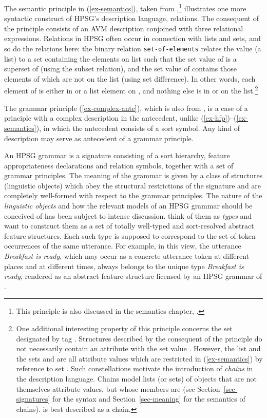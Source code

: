 \documentclass[output=paper
 	        ,biblatex
                ,babelshorthands
                ,newtxmath
                ,draftmode
                ,colorlinks, citecolor=brown
]{langscibook}
\begin{document}
{The semantic principle in (\ref{ex-semantics}), taken
from ,\footnote{This principle is also discussed
in the semantics chapter, .}
illustrates one more syntactic
construct of HPSG's description language, relations. The consequent of
the principle consists of an AVM description conjoined with three
relational expressions.  Relations in HPSG often occur in
connection with lists and sets, and so do the relations here: the
binary relation \texttt{set-of-elements} relates the  value
(a list) to a set  containing the elements on list  such
that the set value  of  is a superset of 
(using the subset relation), and the set value  of 
contains those elements of  which are not on the
 list (using set difference). In other words,
each element of  is either in \mbox{} or
a list element on , and nothing else is in 
or on the  list.\footnote{One
  additional interesting property of this principle concerns the set
  designated by tag . Structures described by the consequent of
  the principle do not necessarily contain an attribute with the set
  value . However, the list  and the sets  and  are
  all attribute values which are restricted in (\ref{ex-semantics}) by reference to set
  . Such constellations motivate the introduction of
  \emph{chains} in the description language. Chains model lists (or
  sets) of objects that are not themselves attribute values, but whose
  members are (see Section~\ref{sec-signatures} for the syntax and
  Section~\ref{sec-meaning} for the semantics of chains).  is best
  described as a chain.}

The grammar principle (\ref{ex-complex-ante}), which is also from
\cite[421]{PY98a-u}, is a case of a principle
with a complex description in the antecedent,
unlike (\ref{ex-hfp})--(\ref{ex-semantics}), in which the antecedent
consists of a sort symbol. Any kind of description
may serve as antecedent of a grammar principle.

An HPSG grammar is a signature consisting of a sort hierarchy, feature
appropriateness declarations and relation symbols, together with a set
of grammar principles. The meaning of the grammar is given by a class
of structures (linguistic objects) which obey the structural
restrictions of the signature and are completely well-formed with
respect to the grammar principles. The nature of the \emph{linguistic
  objects} and how the relevant models of an HPSG grammar should be
conceived of has been subject to intense
discussion. \cite[8--9]{PollardSag1994} think of them as \emph{types} and
want to construct them as a set of totally well-typed and
sort-resolved abstract feature structures. Each such type is supposed
to correspond to the set of token occurrences of the same utterance. For
example, in this view, the  utterance \emph{Breakfast is ready},
which may occur as a concrete utterance token
at different places and at different times, always belongs to the
unique type \emph{Breakfast is ready}, rendered as an abstract feature
structure licensed by an HPSG grammar of .

}
\end{document}

